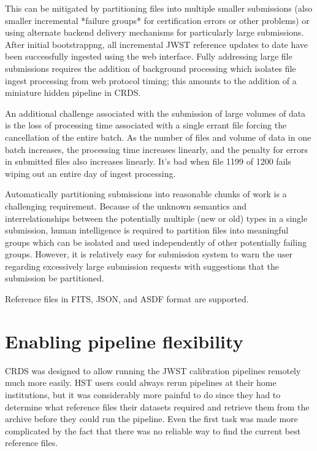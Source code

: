 \documentclass[final,authoryear,5p,times,twocolumn]{elsarticle}
\begin{document}
This can be
mitigated by partitioning files into multiple smaller submissions (also smaller
incremental *failure groups* for certification errors or other problems) or
using alternate backend delivery mechanisms for particularly large submissions.
After initial bootstrappng, all incremental JWST reference updates to date have
been successfully ingested using the web interface.  Fully addressing large
file submissions requires the addition of background processing which isolates
file ingest processing from web protocol timing; this amounts to the addition
of a miniature hidden pipeline in CRDS.  

An additional challenge associated
with the submission of large volumes of data is the loss of processing time
associated with a single errant file forcing the cancellation of the entire
batch.  As the number of files and volume of data in one batch increases, the
processing time increases linearly, and the penalty for errors in submitted
files also increases linearly.  It's bad when file 1199 of 1200 fails wiping
out an entire day of ingest processing.  

Automatically partitioning submissions into reasonable chunks of work is a 
challenging requirement. Because of the unknown semantics and 
interrelationships between the potentially multiple (new or old) types 
in a single submission, human intelligence is required to partition files 
into meaningful groups which can be isolated and used independently 
of other potentially failing groups. However, it is relatively
easy for submission system to warn the user regarding excessively large 
submission requests with suggestions that the submission be partitioned.

Reference files in FITS, JSON, and ASDF format are supported.

\section{Enabling pipeline flexibility}

CRDS was designed to allow running the JWST calibration pipelines remotely much
more easily. HST users could always rerun pipelines at their home institutions,
but it was considerably more painful to do since they had to determine what
reference files their datasets required and retrieve them from the archive
before they could run the pipeline. Even the first task was made more
complicated by the fact that there was no reliable way to find the current best
reference files.
\end{document}
